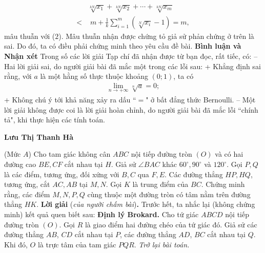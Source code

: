 \begin{multicols}{2}
\begin{align*}
		&\sqrt[{kN}]{{{x_1}}} + \sqrt[{kN}]{{{x_2}}} +  \cdots  + \sqrt[{kN}]{{{x_m}}} \\
		< &\,\,m + \frac{1}{k}\sum\limits_{i = 1}^m {\left( {\sqrt[N]{{{x_i}}} - 1} \right)}  = m,
	\end{align*}
	mâu thuẫn với ($2$).
	\vskip 0.05cm
	Mâu thuẫn nhận được chứng tỏ giả sử phản chứng ở trên là sai. Do đó, ta có điều phải chứng minh theo yêu cầu đề bài.
	\vskip 0.05cm
	\textbf{\color{thachthuctoanhoc}Bình luận và Nhận xét}
	\vskip 0.05cm
	Trong số các lời giải Tạp chí đã nhận được từ bạn đọc, rất tiếc, có:
	\vskip 0.05cm
	-- Hai lời giải sai, do người giải bài đã mắc một trong các lỗi sau:
	\vskip 0.05cm
	+ Khẳng định sai rằng, với $a$ là một hằng số thực thuộc khoảng $(0; 1)$, ta có 
	\begin{align*}
		\mathop {\lim }\limits_{n \to  + \infty } \sqrt[n]{a} = 0;
	\end{align*}
	+ Không chú ý tới khả năng xảy ra dấu ``$=$" ở bất đẳng thức Bernoulli.
	\vskip 0.05cm
	-- Một lời giải không được coi là lời giải hoàn chỉnh, do người giải bài đã mắc lỗi ``chính tả", khi thực hiện các tính toán.
	\begin{flushright}
		\textbf{\color{thachthuctoanhoc}Lưu Thị Thanh Hà}
	\end{flushright}
	{}
	(Mức $A$) Cho tam giác không cân $ABC$ nội tiếp đường tròn $(O)$ và có hai đường cao $BE,CF$ cắt nhau tại $H$. Giả sử   $\angle BAC$ khác $60^\circ,90^\circ$ và $120^\circ$.  Gọi $P, Q$ là các điểm, tương ứng, đối xứng với $B,C $ qua $F, E$. Các đường thẳng $HP, HQ$, tương ứng, cắt $AC, AB$ tại $M, N$.  Gọi $K$ là trung điểm của $BC$. Chứng minh rằng, các điểm $M, N, P, Q$ cùng thuộc một đường tròn có tâm nằm trên đường thẳng $HK$.
	\vskip 0.05cm
	\textbf{\color{thachthuctoanhoc}Lời giải} (\textit{của người chấm bài})\textbf{\color{thachthuctoanhoc}.}
	\vskip 0.05cm
	Trước hết, ta nhắc lại (không chứng minh) kết quả quen biết sau:
	\vskip 0.05cm
	\textbf{\color{thachthuctoanhoc}Định lý Brokard.} Cho tứ giác $ABCD$ nội tiếp đường tròn $(O)$. Gọi $R$ là giao điểm hai đường chéo của tứ giác đó. Giả sử các đường thẳng $AB$, $CD$ cắt nhau tại $P$, các đường thẳng $AD$, $BC$ cắt nhau tại $Q$.  Khi đó, $O$ là trực tâm của tam giác $PQR$.
	\vskip 0.05cm
	\textit{Trở lại bài toán.}
	\begin{figure}[H]
		\vspace*{-5pt}
		\centering
		\captionsetup{labelformat= empty, justification=centering}

\end{figure}
\end{multicols}
